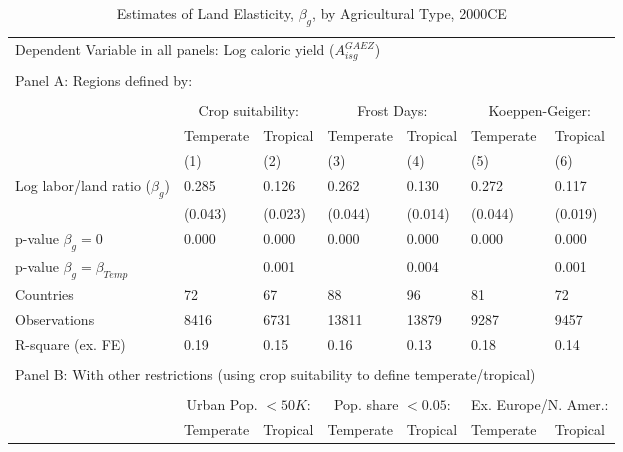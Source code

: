 \documentclass[12pt]{article}
\begin{document}
\begin{table}[!htb]
\begin{center}
\caption{Estimates of Land Elasticity, $\beta_g$, by Agricultural Type, 2000CE}
\label{TAB_beta_crops}
{\footnotesize
\begin{tabularx}{\textwidth}{lXXXXXX}
\midrule
\multicolumn{7}{l}{Dependent Variable in all panels: Log caloric yield ($A^{GAEZ}_{isg}$)} \\ \\
\multicolumn{7}{l}{Panel A: Regions defined by:} \\ \\
 & \multicolumn{2}{c}{Crop suitability:} & \multicolumn{2}{c}{Frost Days:} & \multicolumn{2}{c}{Koeppen-Geiger:}\\ \cmidrule(lr){2-3} \cmidrule(lr){4-5} \cmidrule(lr){6-7} 
 & Temperate & Tropical & Temperate  & Tropical  & Temperate  & Tropical \\
 & (1) & (2) & (3) & (4) & (5) & (6) \\
\midrule
Log labor/land ratio ($\beta_g$)&       0.285&       0.126&       0.262&       0.130&       0.272&       0.117\\
                    &     (0.043)&     (0.023)&     (0.044)&     (0.014)&     (0.044)&     (0.019)\\
\midrule
p-value $\beta_g=0$ &       0.000&       0.000&       0.000&       0.000&       0.000&       0.000\\
p-value $\beta_g=\beta_{Temp}$&            &       0.001&            &       0.004&            &       0.001\\
Countries           &          72&          67&          88&          96&          81&          72\\
Observations        &        8416&        6731&       13811&       13879&        9287&        9457\\
R-square (ex. FE)   &        0.19&        0.15&        0.16&        0.13&        0.18&        0.14\\
\midrule
\\
\multicolumn{7}{l}{Panel B: With other restrictions (using crop suitability to define temperate/tropical)} \\ \\
 & \multicolumn{2}{c}{Urban Pop. $<50K$:} & \multicolumn{2}{c}{Pop. share $<0.05$:} & \multicolumn{2}{c}{Ex. Europe/N. Amer.:} \\ \cmidrule(lr){2-3} \cmidrule(lr){4-5} \cmidrule(lr){6-7}
 & Temperate & Tropical & Temperate  & Tropical  & Temperate  & Tropical \\

\end{tabularx}}
\end{center}
\end{table}
\end{document}
